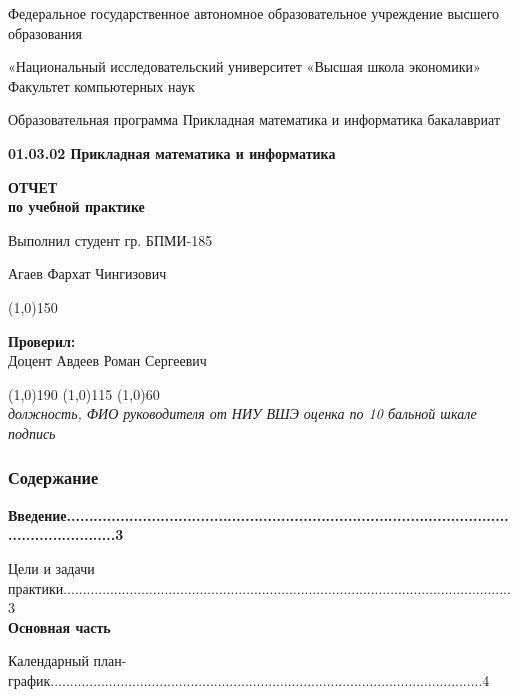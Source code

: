 \documentclass[a4paper,12pt,leqno]{article} %
\begin{document}

\begin{center}
    Федеральное государственное автономное образовательное учреждение
высшего образования

«Национальный исследовательский университет «Высшая школа экономики»
 Факультет компьютерных наук

Образовательная программа Прикладная математика и информатика
бакалавриат

\textbf{01.03.02 Прикладная математика и информатика} \linebreak[4]\vspace{5mm}

\textbf{ОТЧЕТ \\} 
 \textbf{по учебной практике}
\end{center}
\vspace{100mm}

\begin{flushright}
    Выполнил студент гр. БПМИ-185

    Агаев Фархат Чингизович
    

    \line(1,0){150}
\end{flushright}

\vspace{8mm}
\begin{flushleft}
    \textbf{Проверил:} \\
    Доцент Авдеев Роман Сергеевич
\end{flushleft}
\line(1,0){190} \; \; \; \line(1,0){115} \; \; \line(1,0){60} \\
\scriptsize{\textit{должность, ФИО руководителя от НИУ ВШЭ \; \; \; 
оценка по 10 бальной шкале \; \; \; \; \;подпись }
}

\newpage
\subsubsection*{Содержание}
\textbf{Введение...........................................................................................................................3}	

\noindent \quad Цели и задачи практики...................................................................................................................3 \\    

\noindent\textbf{Основная часть} 

\noindent\quad Календарный план-график...............................................................................................................4	\\
\end{document}

